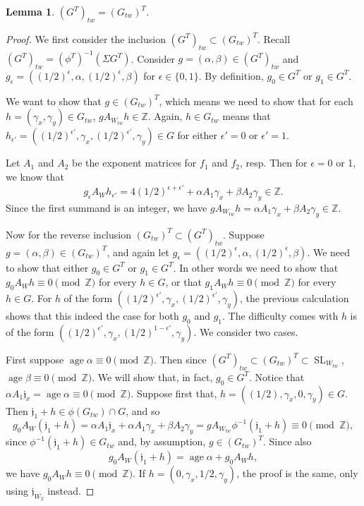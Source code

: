 \documentclass[10pt, letterpaper]{amsart}
\newtheorem{lem}[thm]{Lemma}
\theoremstyle{remark}
\newcommand{\ZZ}{\mathbb{Z}}
\newcommand{\jw}{\mathfrak{j}}
\newcommand{\set}[1]{\{#1\}}
\newcommand{\tw}[1]{{#1}_{tw}}
\newcommand{\s}[1]{\Sigma #1}
\DeclareMathOperator{\SL}{SL}
\DeclareMathOperator{\age}{age}
\begin{document}
\begin{lem}
$\tw{(G^T)} = (\tw{G})^T$. 
\end{lem}
\begin{proof}
We first consider the inclusion $\tw{(G^T)}\subset (\tw{G})^T$. Recall $\tw{(G^T)}=(\phi^T)^{-1}(\s{G^T})$. Consider $g=(\alpha, \beta)\in \tw{(G^T)}$ and $g_\epsilon=((1/2)^{\epsilon},\alpha,(1/2)^{\epsilon},\beta)$ for $\epsilon\in\set{0,1}$. By definition, $g_0\in G^T$ or $g_1\in G^T$. 

We want to show that $g\in (\tw{G})^T$, which means we need to show that for each $h=(\gamma_x,\gamma_y)\in \tw{G}$, $gA_{\tw{W}}h\in \ZZ$. Again, $h\in \tw{G}$ means that $h_{\epsilon'}=((1/2)^{\epsilon'},\gamma_x,(1/2)^{\epsilon'},\gamma_y)\in G$ for either $\epsilon'=0$ or $\epsilon'=1$.

Let $A_1$ and $A_2$ be the exponent matrices for $f_1$ and $f_2$, resp. Then for $\epsilon = 0$ or 1, we know that 
\[
g_\epsilon A_{W}h_{\epsilon'}= 4(1/2)^{\epsilon+\epsilon'}+\alpha A_{1}\gamma_x+\beta A_{2}\gamma_y \in \ZZ.
\]
Since the first summand is an integer, we have $gA_{\tw{W}}h=\alpha A_{1}\gamma_x+\beta A_{2}\gamma_y \in \ZZ$. 

Now for the reverse inclusion $(\tw{G})^T\subset \tw{(G^T)}$. Suppose $g=(\alpha,\beta)\in (\tw{G})^T$, and again let $g_\epsilon= ((1/2)^{\epsilon},\alpha,(1/2)^{\epsilon},\beta)$. We need to show that either $g_0\in G^T$ or $g_1\in G^T$. In other words we need to show that $g_0A_{W}h\equiv 0\pmod \ZZ$ for every $h\in G$, or that $g_1A_{W}h\equiv 0\pmod \ZZ$ for every $h\in G$. For $h$ of the form $((1/2)^{\epsilon'},\gamma_x,(1/2)^{\epsilon'},\gamma_y)$, the previous calculation shows that this indeed the case for both $g_0$ and $g_1$. The difficulty comes with $h$ is of the form $((1/2)^{\epsilon'},\gamma_x,(1/2)^{1-\epsilon'},\gamma_y)$. We consider two cases. 

First suppose $\age \alpha\equiv 0 \pmod \ZZ$. Then since $\tw{(G^T)}\subset (\tw{G})^T\subset \SL_{\tw{W}}$, $\age \beta\equiv 0 \pmod \ZZ$. We will show that, in fact, $g_0\in G^T$. Notice that $\alpha A_1\jw_x=\age \alpha\equiv0\pmod \ZZ$. Suppose first that, $h=((1/2),\gamma_x,0,\gamma_y) \in G$. Then $\jw_{1}+h\in \phi(\tw{G})\cap G$, and so 
\[
g_0 A_W (\jw_{1}+h)=\alpha A_1 \jw_x + \alpha A_1 \gamma_x + \beta A_2 \gamma_y = g A_{\tw{W}} \phi^{-1}(\jw_1 + h) \equiv 0\pmod \ZZ,
\]
since $\phi^{-1}(\jw_1 + h) \in \tw{G}$ and, by assumption,  $g \in (\tw{G})^T$.
Since also 
\[
g_0 A_W (\jw_{1}+h) = \age \alpha + g_0 A_W h,
\]
we have
$
g_0 A_W h \equiv 0\pmod \ZZ.
$
If $h=(0,\gamma_x,1/2,\gamma_y)$, the proof is the same, only using $\jw_{W_2}$ instead. 


\end{proof}
\end{document}
